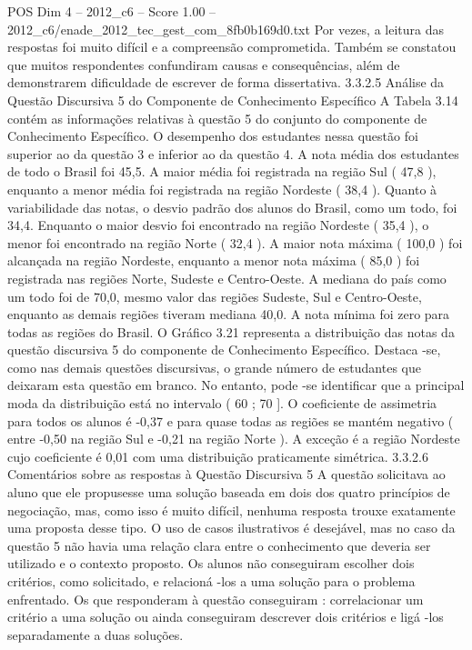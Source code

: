 \begin{textsample}{POS Dim 4 – 2012\_c6 – Score 1.00 – 2012\_c6/enade\_2012\_tec\_gest\_com\_8fb0b169d0.txt}
Por vezes, a leitura das respostas foi muito difícil e a compreensão comprometida.
Também se constatou que muitos respondentes confundiram causas e consequências, além de demonstrarem dificuldade de escrever de forma dissertativa. 3.3.2.5 Análise da Questão Discursiva 5 do Componente de Conhecimento Específico A Tabela 3.14 contém as informações relativas à questão 5 do conjunto do componente de Conhecimento Específico.
O desempenho dos estudantes nessa questão foi superior ao da questão 3 e inferior ao da questão 4.
A nota média dos estudantes de todo o Brasil foi 45,5.
A maior média foi registrada na região Sul ( 47,8 ), enquanto a menor média foi registrada na região Nordeste ( 38,4 ).
Quanto à variabilidade das notas, o desvio padrão dos alunos do Brasil, como um todo, foi 34,4.
Enquanto o maior desvio foi encontrado na região Nordeste ( 35,4 ), o menor foi encontrado na região Norte ( 32,4 ).
A maior nota máxima ( 100,0 ) foi alcançada na região Nordeste, enquanto a menor nota máxima ( 85,0 ) foi registrada nas regiões Norte, Sudeste e Centro-Oeste.
A mediana do país como um todo foi de 70,0, mesmo valor das regiões Sudeste, Sul e Centro-Oeste, enquanto as demais regiões tiveram mediana 40,0.
A nota mínima foi zero para todas as regiões do Brasil.
O Gráfico 3.21 representa a distribuição das notas da questão discursiva 5 do componente de Conhecimento Específico.
Destaca -se, como nas demais questões discursivas, o grande número de estudantes que deixaram esta questão em branco.
No entanto, pode -se identificar que a principal moda da distribuição está no intervalo ( 60 ; 70 ].
O coeficiente de assimetria para todos os alunos é -0,37 e para quase todas as regiões se mantém negativo ( entre -0,50 na região Sul e -0,21 na região Norte ).
A exceção é a região Nordeste cujo coeficiente é 0,01 com uma distribuição praticamente simétrica. 3.3.2.6 Comentários sobre as respostas à Questão Discursiva 5 A questão solicitava ao aluno que ele propusesse uma solução baseada em dois dos quatro princípios de negociação, mas, como isso é muito difícil, nenhuma resposta trouxe exatamente uma proposta desse tipo.
O uso de casos ilustrativos é desejável, mas no caso da questão 5 não havia uma relação clara entre o conhecimento que deveria ser utilizado e o contexto proposto.
Os alunos não conseguiram escolher dois critérios, como solicitado, e relacioná -los a uma solução para o problema enfrentado.
Os que responderam à questão conseguiram : correlacionar um critério a uma solução ou ainda conseguiram descrever dois critérios e ligá -los separadamente a duas soluções.

\end{textsample}
